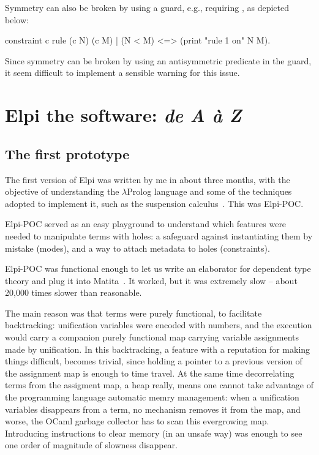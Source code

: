 \documentclass[a4paper, 11pt]{book}
\begin{document}
Symmetry can also be broken by using a guard, e.g., requiring
, as depicted below:

\begin{elpicodelj}
constraint c {
  rule (c N) (c M) | (N < M) <=>
    (print "rule 1 on" N M).
}
\end{elpicodelj}
Since symmetry can be broken by using an antisymmetric predicate in the
guard, it seem difficult to implement a sensible warning for
this issue.


\chapter{Elpi the software: \emph{de A \`a Z}}

\section{The first prototype}\label{sec:poc}


The first version of Elpi was written by me in about three months, with the
objective of understanding the $\lambda$Prolog language and some of the
techniques adopted to implement it, such as the suspension
calculus~\cite{NADATHUR200235}. This was Elpi-POC.

Elpi-POC served as an easy playground to understand which features were needed
to manipulate terms with holes: a safeguard against instantiating them by
mistake (modes), and a way to attach metadata to holes (constraints).


Elpi-POC was functional enough to let us write an elaborator for dependent type
theory and plug it into Matita~\cite{DBLP:conf/cade/AspertiRCT11}. It worked,
but it was extremely slow -- about 20,000 times slower than reasonable.


The main reason was that
terms were purely functional, to facilitate backtracking: unification
variables were encoded with numbers, and the execution would carry a
companion purely functional map carrying variable assignments made by unification.
In this backtracking, a feature with a
reputation for making things difficult, becomes trivial, since 
holding a pointer to a previous version of the assignment map is
enough to time travel. At the same time decorrelating terms from
the assigment map, a heap really, means one cannot take advantage of
the programming language automatic memry management: when a unification
variables disappears from a term, no mechanism removes it from the map,
and worse, the OCaml garbage collector has to scan this evergrowing
map.\\
Introducing instructions to clear memory (in an unsafe way) was enough to see
one order of magnitude of slowness disappear.
\end{document}
